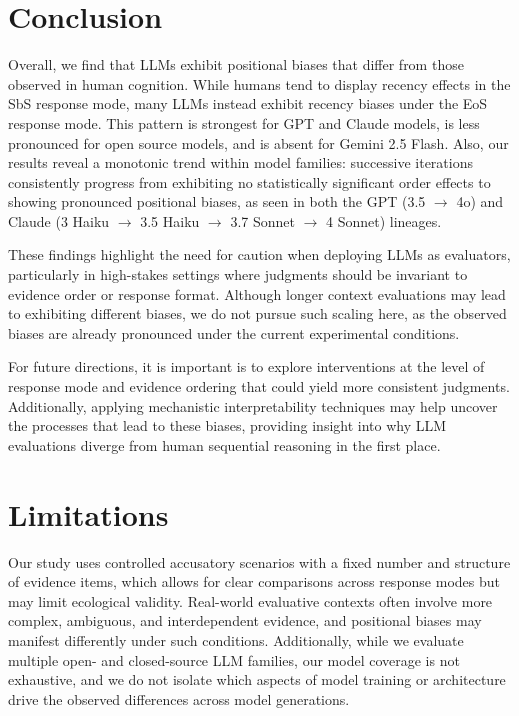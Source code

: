 \documentclass[11pt, letterpaper]{article}
\begin{document}
\section{Conclusion}
Overall, we find that LLMs exhibit positional biases that differ from those observed in human cognition. While humans tend to display recency effects in the SbS response mode, many LLMs instead exhibit recency biases under the EoS response mode. This pattern is strongest for GPT and Claude models, is less pronounced for open source models, and is absent for Gemini 2.5 Flash. Also, our results reveal a monotonic trend within model families: successive iterations consistently progress from exhibiting no statistically significant order effects to showing pronounced positional biases, as seen in both the GPT (3.5 $\to$ 4o) and Claude (3 Haiku $\to$ 3.5 Haiku $\to$ 3.7 Sonnet $\to$ 4 Sonnet) lineages.

These findings highlight the need for caution when deploying LLMs as evaluators, particularly in high-stakes settings where judgments should be invariant to evidence order or response format. Although longer context evaluations may lead to exhibiting different biases, we do not pursue such scaling here, as the observed biases are already pronounced under the current experimental conditions.

For future directions, it is important is to explore interventions at the level of response mode and evidence ordering that could yield more consistent judgments. Additionally, applying mechanistic interpretability techniques may help uncover the processes that lead to these biases, providing insight into why LLM evaluations diverge from human sequential reasoning in the first place.

\section*{Limitations}

Our study uses controlled accusatory scenarios with a fixed number and structure of evidence items, which allows for clear comparisons across response modes but may limit ecological validity. Real-world evaluative contexts often involve more complex, ambiguous, and interdependent evidence, and positional biases may manifest differently under such conditions. Additionally, while we evaluate multiple open- and closed-source LLM families, our model coverage is not exhaustive, and we do not isolate which aspects of model training or architecture drive the observed differences across model generations.
\end{document}
